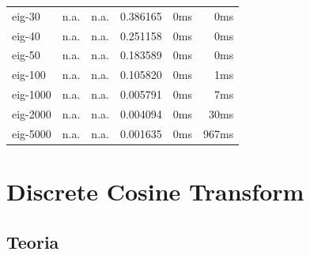 \documentclass[12pt]{article}
\begin{document}
\begin{table}[h]
\begin{center}
\begin{tabular}{|l|r|r|r|r|r|}
      eig-30 &	            n.a. &	              n.a. &           0.386165 & 	0ms		 &			0ms   \\
      eig-40 &	            n.a. &	              n.a. &           0.251158 & 	0ms		 &			0ms   \\
      eig-50 &	            n.a. &	              n.a. &           0.183589 & 	0ms		 &			0ms   \\
     eig-100 &	            n.a. &	              n.a. &           0.105820 & 	0ms		 &			1ms   \\
    eig-1000 &	            n.a. &	              n.a. &           0.005791 & 	0ms		 &			7ms   \\
    eig-2000 &	            n.a. &	              n.a. &           0.004094 & 	0ms		&			30ms   \\
    eig-5000 &	            n.a. &	              n.a. &           0.001635 &	0ms		&			967ms   \\
\hline
\end{tabular}
\end{center}
\end{table}

\newpage

\section{Discrete Cosine Transform}
\subsection{Teoria}
\end{document}
